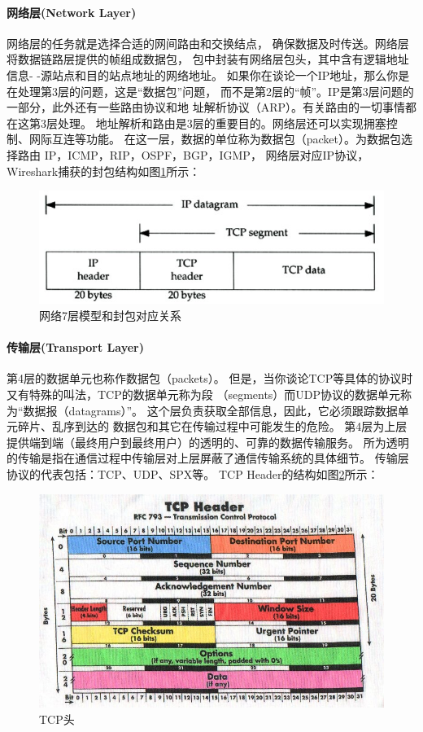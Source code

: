 \documentclass{book}
\begin{document}
\paragraph{网络层(Network Layer)}网络层的任务就是选择合适的网间路由和交换结点，
确保数据及时传送。网络层将数据链路层提供的帧组成数据包，
包中封装有网络层包头，其中含有逻辑地址信息- -源站点和目的站点地址的网络地址。
如果你在谈论一个IP地址，那么你是在处理第3层的问题，这是“数据包”问题，
而不是第2层的“帧”。IP是第3层问题的一部分，此外还有一些路由协议和地 址解析协议（ARP）。有关路由的一切事情都在这第3层处理。
地址解析和路由是3层的重要目的。网络层还可以实现拥塞控制、网际互连等功能。
在这一层，数据的单位称为数据包（packet）。为数据包选择路由 IP，ICMP，RIP，OSPF，BGP，IGMP，
网络层对应IP协议，
Wireshark捕获的封包结构如图\ref{fig:IPDiagram}所示：

\begin{figure}[htbp]
	\centering
	\includegraphics[scale=0.6]{IPDiagram.jpg}
	\caption{网络7层模型和封包对应关系}
	\label{fig:IPDiagram}
\end{figure}

\paragraph{传输层(Transport Layer)}第4层的数据单元也称作数据包（packets）。
但是，当你谈论TCP等具体的协议时又有特殊的叫法，TCP的数据单元称为段 （segments）而UDP协议的数据单元称为“数据报（datagrams）”。
这个层负责获取全部信息，因此，它必须跟踪数据单元碎片、乱序到达的 数据包和其它在传输过程中可能发生的危险。
第4层为上层提供端到端（最终用户到最终用户）的透明的、可靠的数据传输服务。
所为透明的传输是指在通信过程中传输层对上层屏蔽了通信传输系统的具体细节。
传输层协议的代表包括：TCP、UDP、SPX等。
TCP Header的结构如图\ref{fig:TCPHeaderStructure}所示：

\begin{figure}[htbp]
	\centering
	\includegraphics[scale=0.6]{TCPHeaderStructure.jpg}
	\caption{TCP头}
	\label{fig:TCPHeaderStructure}
\end{figure}
\end{document}
